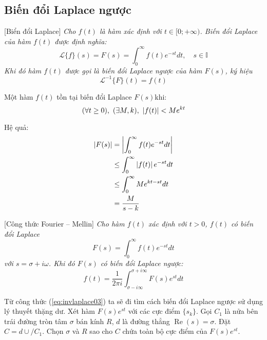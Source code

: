 \subsection{Biến đổi Laplace ngược}
\begin{definition}
	\label{def:laplace_transform}
	[Biển đổi Laplace]
	\textit{Cho \(f(t)\) là hàm xác định với \(t \in [0; +\infty)\). Biến đổi Laplace của hàm \(f(t)\) được định nghĩa: }
	\begin{equation}
		\mathcal{L}\{f\}(s) = F(s)=\int_0^\infty f(t)e^{-st}dt , \quad s \in \mathbb I
		\label{eq:invlaplace01}
	\end{equation}
	\textit{Khi đó hàm \(f(t)\) được gọi là biến đổi Laplace ngược của hàm \(F(s)\), ký hiệu}
	\begin{equation}
		\label{eq:invlaplace02}
		\mathcal{L}^{-1}\{F\}(t) = f(t)
	\end{equation}
\end{definition}

\begin{theorem}
	Một hàm \(f(t)\) tồn tại biến đổi Laplace \(F(s)\)khi:
	\begin{equation}
		\label{eq:laplaceexist01}
		(\forall t \ge 0),\ (\exists M, k),\ \left\lvert f(t)\right\rvert < Me^{kt}
	\end{equation}
\end{theorem}

Hệ quả:
\begin{align}
	\label{eq:laplaceexist02}
	\left\lvert F(s)\right\rvert &= \left\lvert\int_0^\infty f(t)e^{-st}dt\right\rvert\nonumber\\
		   &\le \int_0^\infty\left\lvert f(t)\right\rvert e^{-st}dt\nonumber\\
		   &\le \int_0^\infty Me^{kt-st}dt\nonumber\\
		   &=\frac{M}{s-k}
\end{align}

\begin{definition}
	\label{def:inv_laplace_transform}
	[Công thức Fourier -- Mellin]
	\textit{Cho hàm \(f(t)\) xác định với \(t>0\), \(f(t)\) có biến đổi Laplace
	\[F(s) = \int_0^\infty f(t)e^{-st}dt\] với \(s = \sigma + i\omega\). Khi đó \(F(s)\) có biến đổi Laplace ngược:}
	\begin{equation}
		f(t)=\frac{1}{2\pi i}\int_{\sigma-i\infty}^{\sigma+i\infty} F(s)e^{st}dt
		\label{eq:invlaplace03}
	\end{equation}
\end{definition}


Từ công thức (\ref{eq:invlaplace03}) ta sẽ đi tìm cách biến đổi Laplace ngược sử dụng lý thuyết thặng dư. Xét hàm $F(s)e^{st}$ với các cực điểm $\{s_k\}$. Gọi $C_1$ là nửa bên trái đường tròn tâm $\sigma$ bán kính $R$, $d$ là đường thẳng \(\operatorname{Re}(s) = \sigma\). Đặt $C = d \cup/C_1$. Chọn $\sigma$ và $R$ sao cho $C$ chứa toàn bộ cực điểm của $F(s)e^{st}$.


